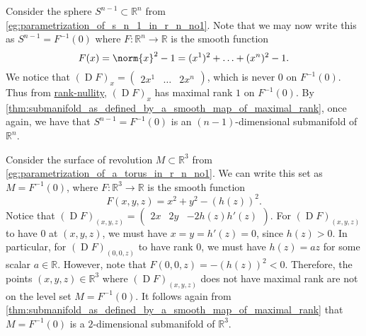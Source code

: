 \documentclass[notoc,notitlepage]{tufte-book}
\DeclareMathOperator{\D}{D}
\begin{document}
\begin{eg}\label{eg:parametrization_of_s_n_1_in_r_n_no2}
  Consider the sphere $S^{n - 1} \subset \mathbb{R}^n$ from
  \cref{eg:parametrization_of_s_n_1_in_r_n_no1}. Note that we may now write this
  as $S^{ n - 1 } = F^{-1}(0)$ where $F : \mathbb{R}^n \to \mathbb{R}$ is the
  smooth function
  \begin{equation*}
    F(x) = \norm{x}^2 - 1 = (x^1)^2 + \hdots + (x^n)^2 - 1.
  \end{equation*}
  We notice that $(\D F)_x = \begin{pmatrix} 2x^1 & \hdots & 2x^n
  \end{pmatrix}$, which is never $0$ on $F^{-1}(0)$. Thus from
  \hyperref[thm:rank_nullity_theorem]{rank-nullity}, $(\D F)_x$ has maximal rank
  $1$ on $F^{-1}(0)$. By
  \cref{thm:submanifold_as_defined_by_a_smooth_map_of_maximal_rank}, once again,
  we have that $S^{n - 1} = F^{-1}(0)$ is an $(n - 1)$-dimensional submanifold
  of $\mathbb{R}^n$.
\end{eg}

\begin{eg}
  Consider the surface of revolution $M \subset \mathbb{R}^3$ from
  \cref{eg:parametrization_of_a_torus_in_r_n_no1}. We can write this set as $M =
  F^{-1}(0)$, where $F : \mathbb{R}^3 \to \mathbb{R}$ is the smooth function
  \begin{equation*}
    F(x, y, z) = x^2 + y^2 - (h(z))^2.
  \end{equation*}
  Notice that $(\D F)_{(x, y, z)} = \begin{pmatrix} 2x & 2y & -2h(z)h'(z)
  \end{pmatrix}$. For $(\D F)_{(x, y, z)}$ to have $0$ at $(x, y, z)$, we
  must have $x = y = h'(z) = 0$, since $h(z) > 0$. In particular, for $(\D
  F)_{(0, 0, z)}$ to have rank $0$, we must have $h(z) = az$ for some scalar $a \in
  \mathbb{R}$. However, note that $F(0, 0, z) = -(h(z))^2 < 0$. Therefore, the
  points $(x, y, z) \in \mathbb{R}^3$ where $(\D F)_{(x, y, z)}$ does not have
  maximal rank are not on the level set $M = F^{-1}(0)$. It follows again from
  \cref{thm:submanifold_as_defined_by_a_smooth_map_of_maximal_rank} that $M =
  F^{-1}(0)$ is a $2$-dimensional submanifold of $\mathbb{R}^3$.
\end{eg}
\end{document}

